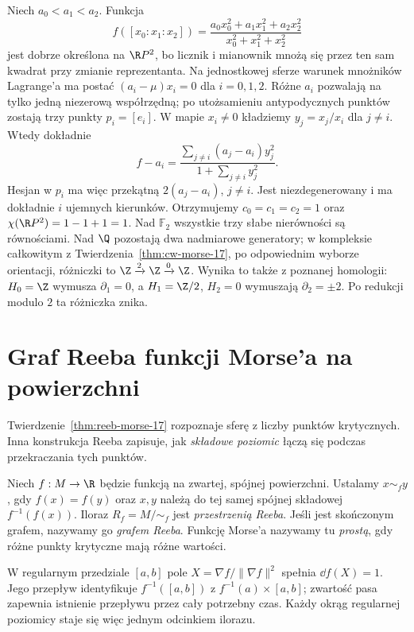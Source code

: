 \begin{przyklad}
\label{prz:morse-rp2-22}
Niech $a_0<a_1<a_2$. Funkcja
\[
 f([x_0:x_1:x_2])
 =\frac{a_0x_0^2+a_1x_1^2+a_2x_2^2}
        {x_0^2+x_1^2+x_2^2}
\]
jest dobrze określona na $\R P^2$, bo licznik i mianownik
mnożą się przez ten sam kwadrat przy zmianie reprezentanta.
Na jednostkowej sferze warunek mnożników Lagrange'a ma postać
$(a_i-\mu)x_i=0$ dla $i=0,1,2$.
Różne $a_i$ pozwalają na tylko jedną niezerową współrzędną;
po utożsamieniu antypodycznych punktów zostają trzy punkty $p_i=[e_i]$.
W mapie $x_i\ne0$ kładziemy $y_j=x_j/x_i$ dla $j\ne i$.
Wtedy dokładnie
\[
 f-a_i=\frac{\sum_{j\ne i}(a_j-a_i)y_j^2}
                  {1+\sum_{j\ne i}y_j^2}.
\]
Hesjan w $p_i$ ma więc przekątną $2(a_j-a_i)$, $j\ne i$.
Jest niezdegenerowany i ma dokładnie $i$ ujemnych kierunków.
Otrzymujemy $c_0=c_1=c_2=1$ oraz
$\chi(\R P^2)=1-1+1=1$.
Nad $\mathbb F_2$ wszystkie trzy słabe nierówności są równościami.
Nad $\Q$ pozostają dwa nadmiarowe generatory; w kompleksie
całkowitym z Twierdzenia~\ref{thm:cw-morse-17},
po odpowiednim wyborze orientacji, różniczki to
$\Z\xrightarrow{2}\Z\xrightarrow{0}\Z$.
Wynika to także z poznanej homologii:
$H_0=\Z$ wymusza $\partial_1=0$, a
$H_1=\Z/2$, $H_2=0$ wymuszają $\partial_2=\pm2$.
Po redukcji modulo $2$ ta różniczka znika.
\end{przyklad}

\section{Graf Reeba funkcji Morse'a na powierzchni}
\label{sec:graf-reeba-22}

Twierdzenie~\ref{thm:reeb-morse-17} rozpoznaje sferę
z liczby punktów krytycznych. Inna konstrukcja Reeba
zapisuje, jak \emph{składowe poziomic} łączą się podczas
przekraczania tych punktów.

\begin{definicja}
Niech $f:M\to\R$ będzie funkcją na zwartej, spójnej
powierzchni. Ustalamy $x\sim_f y$, gdy $f(x)=f(y)$
oraz $x,y$ należą do tej samej spójnej składowej
$f^{-1}(f(x))$. Iloraz $R_f=M/{\sim_f}$ jest
\emph{przestrzenią Reeba}. Jeśli jest skończonym
grafem, nazywamy go \emph{grafem Reeba}.
Funkcję Morse'a nazywamy tu \emph{prostą}, gdy
różne punkty krytyczne mają różne wartości.
\end{definicja}

W regularnym przedziale $[a,b]$ pole
$X=\nabla f/\|\nabla f\|^2$ spełnia
$\dd f(X)=1$. Jego przepływ identyfikuje
$f^{-1}([a,b])$ z $f^{-1}(a)\times[a,b]$;
zwartość pasa zapewnia istnienie przepływu przez
cały potrzebny czas. Każdy okrąg regularnej
poziomicy staje się więc jednym odcinkiem ilorazu.


